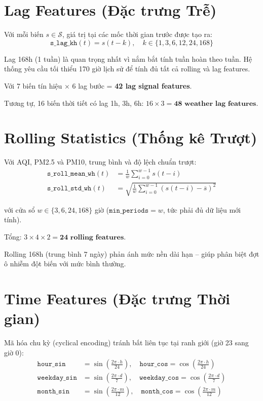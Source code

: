 \documentclass[12pt,a4paper]{report}
\begin{document}
\section{Lag Features (Đặc trưng Trễ)}

Với mỗi biến $s \in \mathcal{S}$, giá trị tại các mốc thời gian trước được tạo ra:
\begin{equation}
  \texttt{s\_lag\_kh}(t) = s(t - k), \quad k \in \{1, 3, 6, 12, 24, 168\}
\end{equation}

Lag 168h (1 tuần) là quan trọng nhất vì nắm bắt tính tuần hoàn theo tuần. Hệ thống yêu cầu tối thiểu 170 giờ lịch sử để tính đủ tất cả rolling và lag features.

Với 7 biến tín hiệu × 6 lag bước = \textbf{42 lag signal features}.

Tương tự, 16 biến thời tiết có lag 1h, 3h, 6h: $16 \times 3 = \textbf{48 weather lag features}$.

\section{Rolling Statistics (Thống kê Trượt)}

Với AQI, PM2.5 và PM10, trung bình và độ lệch chuẩn trượt:
\begin{align}
  \texttt{s\_roll\_mean\_wh}(t) &= \frac{1}{w}\sum_{i=0}^{w-1} s(t-i) \\[4pt]
  \texttt{s\_roll\_std\_wh}(t)  &= \sqrt{\frac{1}{w}\sum_{i=0}^{w-1}\!\left(s(t-i) - \overline{s}\right)^2}
\end{align}

với cửa sổ $w \in \{3, 6, 24, 168\}$ giờ ($\texttt{min\_periods} = w$, tức phải đủ dữ liệu mới tính).

Tổng: $3 \times 4 \times 2 = \textbf{24 rolling features}$.

Rolling 168h (trung bình 7 ngày) phản ánh mức nền dài hạn -- giúp phân biệt đợt ô nhiễm đột biến với mức bình thường.

\section{Time Features (Đặc trưng Thời gian)}

Mã hóa chu kỳ (cyclical encoding) tránh bất liên tục tại ranh giới (giờ 23 sang giờ 0):
\begin{align}
  \texttt{hour\_sin}     &= \sin\!\left(\tfrac{2\pi \cdot h}{24}\right), \quad
  \texttt{hour\_cos}      = \cos\!\left(\tfrac{2\pi \cdot h}{24}\right) \\
  \texttt{weekday\_sin}  &= \sin\!\left(\tfrac{2\pi \cdot d}{7}\right), \quad
  \texttt{weekday\_cos}   = \cos\!\left(\tfrac{2\pi \cdot d}{7}\right) \\
  \texttt{month\_sin}    &= \sin\!\left(\tfrac{2\pi \cdot m}{12}\right), \quad
  \texttt{month\_cos}     = \cos\!\left(\tfrac{2\pi \cdot m}{12}\right)
\end{align}
\end{document}
